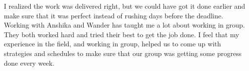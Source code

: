 \documentclass{sig-alternate}
\begin{document}
		\normalfont \normalsize{I realized the work was delivered right, but we could have got it done earlier and make sure that it was perfect instead of rushing days before the deadline. Working with Anshika and Wander has taught me a lot about working in group. They both worked hard and tried their best to get the job done. I feel that my experience in the field, and working in group, helped us to come up with strategies and schedules to make sure that our group was getting some progress done every week.\newline }
\end{document}
